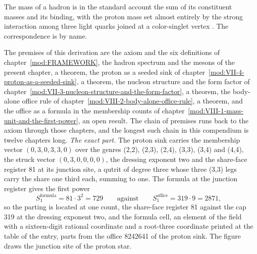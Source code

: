 \begin{chbridge}
The mass of a hadron is in the standard account the sum of its constituent masses and its binding, with the proton mass set almost entirely by the strong interaction among three light quarks joined at a color-singlet vertex \cite{Gasser1982,Peskin1995}. The correspondence is by name.
\end{chbridge}
\begin{chproof}
The premises of this derivation are the axiom and the six definitions of chapter~\ref{mod:FRAMEWORK}, the hadron spectrum and the mesons of the present chapter, a theorem, the proton as a seeded sink of chapter~\ref{mod:VII-4-proton-as-a-seeded-sink}, a theorem, the nucleon structure and the form factor of chapter~\ref{mod:VII-3-nucleon-structure-and-the-form-factor}, a theorem, the body-alone office rule of chapter~\ref{mod:VIII-2-body-alone-office-rule}, a theorem, and the office as a formula in the membership counts of chapter~\ref{mod:VIII-1-mass-unit-and-the-first-power}, an open result. The chain of premises runs back to the axiom through those chapters, and the longest such chain in this compendium is twelve chapters long.
\textit{The exact part.} The proton sink carries the membership vector $(0, 3, 0, 3, 3, 0)$ over the genres (2,2), (2,3), (2,4), (3,3), (3,4) and (4,4), the struck vector $(0, 3, 0, 0, 0, 0)$, the dressing exponent two and the share-face register 81 at its junction site, a qutrit of degree three whose three (3,3) legs carry the share one third each, summing to one. The formula at the junction register gives the first power
\begin{equation} S_{1}^{\mathrm{formula}} = 81\cdot 3^{2} = 729 \qquad \text{against} \qquad S_{1}^{\mathrm{office}} = 319\cdot 9 = 2871 , \end{equation}
so the parting is located at one count, the share-face register 81 against the cap 319 at the dressing exponent two, and the formula cell, an element of the field with a sixteen-digit rational coordinate and a root-three coordinate printed at the table of the entry, parts from the office 8242641 of the proton sink. The figure draws the junction site of the proton star.

\end{chproof}

